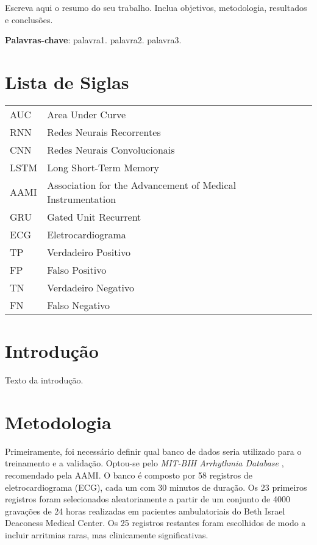 \documentclass[
    12pt,                %
    openright,           %
    oneside,             %
    a4paper,             %
    brazil               %
]{abntex2}
\begin{document}
\imprimircapa
\imprimirfolhaderosto*

\begin{resumo}
Escreva aqui o resumo do seu trabalho.  
Inclua objetivos, metodologia, resultados e conclusões.

\vspace{\onelineskip}
\noindent
\textbf{Palavras-chave}: palavra1. palavra2. palavra3.
\end{resumo}

\tableofcontents

\chapter*{Lista de Siglas} 
\begin{tabular}{ll}
AUC & Area Under Curve \\
RNN & Redes Neurais Recorrentes \\
CNN & Redes Neurais Convolucionais \\
LSTM & Long Short-Term Memory \\
AAMI & Association for the Advancement of Medical Instrumentation   \\
GRU & Gated Unit Recurrent \\
ECG & Eletrocardiograma \\
TP & Verdadeiro Positivo \\
FP & Falso Positivo \\
TN & Verdadeiro Negativo \\
FN & Falso Negativo \\
\end{tabular}



\chapter{Introdução}
Texto da introdução.

\chapter{Metodologia}

Primeiramente, foi necessário definir qual banco de dados seria utilizado para o treinamento e a validação. Optou-se pelo \textit{MIT-BIH Arrhythmia Database} \cite{mitbih2005}, recomendado pela AAMI. O banco é composto por 58 registros de eletrocardiograma (ECG), cada um com 30 minutos de duração. Os 23 primeiros registros foram selecionados aleatoriamente a partir de um conjunto de 4000 gravações de 24 horas realizadas em pacientes ambulatoriais do Beth Israel Deaconess Medical Center. Os 25 registros restantes foram escolhidos de modo a incluir arritmias raras, mas clinicamente significativas.
\end{document}
